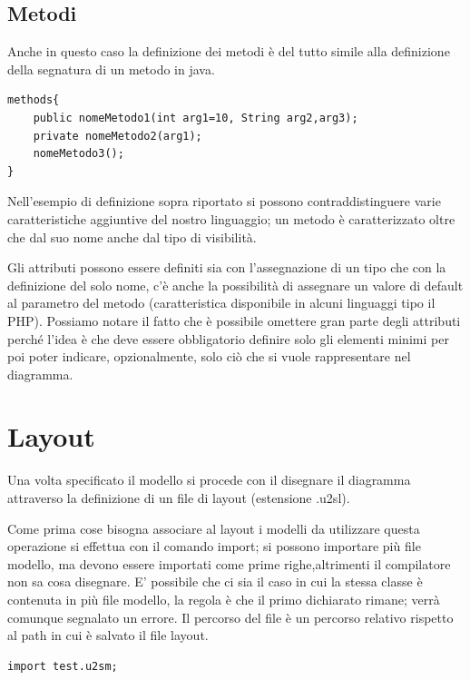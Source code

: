 \subsection{Metodi}

Anche in questo caso la definizione dei metodi è del tutto simile alla
definizione della segnatura di un metodo in java.

\begin{lstlisting}[caption={Dichiarazione di metodi}, style={model}]
methods{
	public nomeMetodo1(int arg1=10, String arg2,arg3);
	private nomeMetodo2(arg1);
	nomeMetodo3();
}
\end{lstlisting}

Nell'esempio di definizione sopra riportato si possono contraddistinguere varie 
caratteristiche aggiuntive del nostro linguaggio; un metodo è caratterizzato
oltre che dal suo nome anche dal tipo di visibilità.

Gli attributi possono essere definiti sia con l'assegnazione di un tipo che con
la definizione del solo nome, c'è anche la possibilità di assegnare un valore di
default al parametro del metodo (caratteristica disponibile in alcuni linguaggi
tipo il PHP).
Possiamo notare il fatto che è possibile omettere gran parte degli attributi
perché l'idea è che deve essere obbligatorio definire solo gli elementi minimi
per poi poter indicare, opzionalmente, solo ciò che si vuole rappresentare nel
diagramma. 


\section{Layout}


Una volta specificato il modello si procede con il disegnare il diagramma
attraverso la definizione di un file di layout (estensione .u2sl).

Come prima cose bisogna associare al layout i modelli da utilizzare questa
operazione si effettua con il comando import; si possono importare più file
modello, ma devono essere importati come prime righe,altrimenti il compilatore
non sa cosa disegnare. E' possibile che ci sia il caso in cui la stessa classe è
contenuta in più file modello, la regola è che il primo dichiarato rimane; verrà
comunque segnalato un errore. Il percorso del file è un percorso relativo
rispetto al path in cui è salvato il file layout.

\begin{lstlisting}[caption={Import dei modelli necessari}, style={layout}] 
import test.u2sm;
\end{lstlisting}

